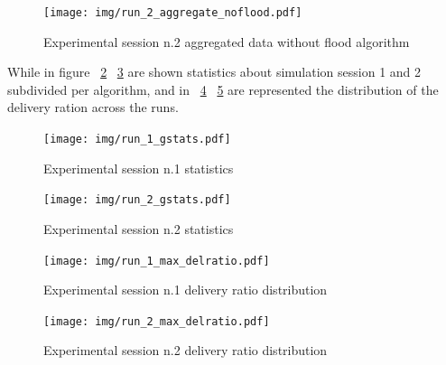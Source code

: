 \begin{figure}[h!]
	\begin{center}
    \label{fig:run_2_aggregate_noflood}
    \texttt{[image: img/run\_2\_aggregate\_noflood.pdf]}
    \caption{Experimental session n.2 aggregated data without flood algorithm}
  \end{center}
\end{figure}
\newpage

While in figure ~\ref{fig:run_1_gstats} ~\ref{fig:run_2_gstats} are shown statistics about simulation session 1 and 2 subdivided per algorithm, and in ~\ref{fig:run_1_max_delratio} ~\ref{fig:run_2_max_delratio} are represented the distribution of the delivery ration across the runs.
\begin{figure}[h!]
	\begin{center}
    \label{fig:run_1_gstats}
    \texttt{[image: img/run\_1\_gstats.pdf]}
    \caption{Experimental session n.1 statistics}
  \end{center}
\end{figure}
\begin{figure}[h!]
	\begin{center}
    \label{fig:run_2_gstats}
    \texttt{[image: img/run\_2\_gstats.pdf]}
    \caption{Experimental session n.2 statistics}
  \end{center}
\end{figure}
\newpage
\begin{figure}[h!]
	\begin{center}
    \label{fig:run_1_max_delratio}
    \texttt{[image: img/run\_1\_max\_delratio.pdf]}
    \caption{Experimental session n.1 delivery ratio distribution}
  \end{center}
\end{figure}
\begin{figure}[h!]
	\begin{center}
    \label{fig:run_2_max_delratio}
    \texttt{[image: img/run\_2\_max\_delratio.pdf]}
    \caption{Experimental session n.2 delivery ratio distribution}
  \end{center}
\end{figure}
\newpage